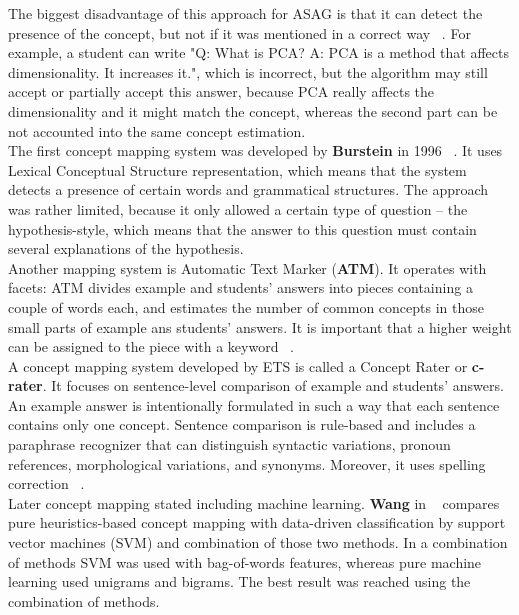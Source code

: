 The biggest disadvantage of this approach for ASAG is that it can detect the presence of the concept, but not if it was mentioned in a correct way ~\cite{Dzikovska}. For example, a student can write "Q: What is PCA? A: PCA is a method that affects dimensionality. It increases it.", which is incorrect, but the algorithm may still accept or partially accept this answer, because PCA really affects the dimensionality and it might match the concept, whereas the second part can be not accounted into the same concept estimation.\\

The first concept mapping system was developed by \textbf{Burstein} in 1996 ~\cite{Burrows}. It uses  Lexical Conceptual Structure representation, which means that the system detects a presence of certain words and grammatical structures. The approach was rather limited, because it only allowed a certain type of question -- the  hypothesis-style, which means that the answer to this question must contain several explanations of the hypothesis.\\

Another mapping system is Automatic Text Marker (\textbf{ATM}). It operates with facets: ATM divides example and students' answers into pieces containing a couple of words each, and estimates the number of common concepts in those small parts of example ans students' answers. It is important that a higher weight can be assigned to the piece with a keyword ~\cite{Burrows}.\\

A concept mapping system developed by ETS is called a Concept Rater or \textbf{c-rater}. It focuses on sentence-level comparison of example and students' answers. An example answer is intentionally formulated in such a way that each sentence contains only one concept. Sentence comparison is rule-based and includes a paraphrase recognizer that can distinguish syntactic variations, pronoun references, morphological variations, and synonyms. Moreover, it uses spelling correction ~\cite{c-rater}. \\

Later concept mapping stated including machine learning. \textbf{Wang} in ~\cite{Wang} compares pure heuristics-based concept mapping with  data-driven classification by support vector machines (SVM) and combination of those two methods. In a combination of methods SVM was used with bag-of-words features, whereas pure machine learning used unigrams and bigrams. The best result was reached using the combination of methods.\\

